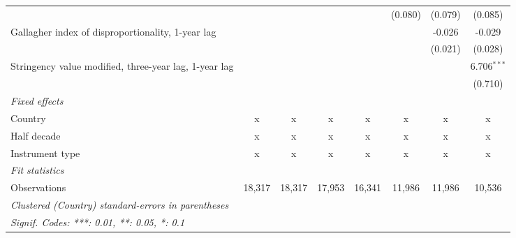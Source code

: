 \begin{table}[htbp]
\begin{tabular}{lccccccc}
                                                            &              &              &              &         & (0.080)       & (0.079)       & (0.085)\\   
      Gallagher index of disproportionality, 1-year lag     &              &              &              &         &               & -0.026        & -0.029\\   
                                                            &              &              &              &         &               & (0.021)       & (0.028)\\   
      Stringency value modified, three-year lag, 1-year lag &              &              &              &         &               &               & 6.706$^{***}$\\   
                                                            &              &              &              &         &               &               & (0.710)\\   
      \emph{Fixed effects}\\
      Country                                               & x            & x            & x            & x       & x             & x             & x\\  
      Half decade                                           & x            & x            & x            & x       & x             & x             & x\\  
      Instrument type                                       & x            & x            & x            & x       & x             & x             & x\\  
      \midrule \emph{Fit statistics}\\
      Observations                                          & 18,317       & 18,317       & 17,953       & 16,341  & 11,986        & 11,986        & 10,536\\  
      \midrule
      \multicolumn{8}{l}{\emph{Clustered (Country) standard-errors in parentheses}}\\
      \multicolumn{8}{l}{\emph{Signif. Codes: ***: 0.01, **: 0.05, *: 0.1}}\\
   \end{tabular}
\end{table}


